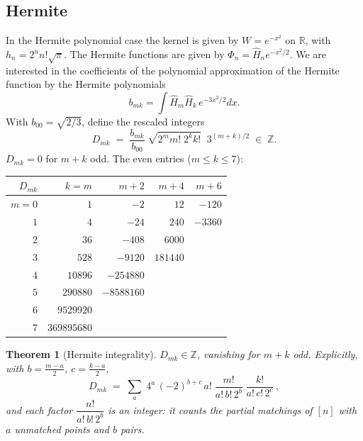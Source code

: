 \documentclass[11pt,a4paper]{article}
\newtheorem{theorem}{Theorem}[section]
\theoremstyle{definition}
\newcommand{\R}{\mathbb{R}}
\newcommand{\Z}{\mathbb{Z}}
\begin{document}
\subsection{Hermite}

In the Hermite polynomial case the kernel is given by
$W = e^{-x^2}$ on $\R$, with $h_n = 2^n n! \sqrt\pi$.
The Hermite functions are given by $\Phi_n = \widehat H_n e^{-x^2/2}$.
We are interested in the coefficients of the polynomial approximation
of the Hermite function by the Hermite polynomials
\[
  b_{mk} = \int \widehat H_m \widehat H_k\, e^{-3x^2/2} dx .
\]
With $b_{00} = \sqrt{2/3}$, define the rescaled integers
\[
  D_{mk} \;=\; \frac{b_{mk}}{b_{00}}\;
  \sqrt{2^m m!\; 2^k k!}\;\; 3^{(m+k)/2} \;\in\; \Z .
\]
$D_{mk} = 0$ for $m+k$ odd. The even entries ($m \le k \le 7$):

\begin{tcolorbox}[colback=black!5, colframe=black!5, boxrule=0pt, sharp corners]
\begin{center}
\begin{tabular}{r|rrrr}
$D_{mk}$ & $k=m$ & $m{+}2$ & $m{+}4$ & $m{+}6$ \\
\hline
$m=0$ & $1$      & $-2$      & $12$      & $-120$ \\
$1$   & $4$      & $-24$     & $240$     & $-3360$ \\
$2$   & $36$     & $-408$    & $6000$    &  \\
$3$   & $528$    & $-9120$   & $181440$  &  \\
$4$   & $10896$  & $-254880$ &           &  \\
$5$   & $290880$ & $-8588160$&           &  \\
$6$   & $9529920$&           &           &  \\
$7$   & $369895680$ &        &           &  \\
\end{tabular}
\end{center}
\end{tcolorbox}

\begin{tcolorbox}[colback=black!5, colframe=black!5, boxrule=0pt, sharp corners]
\begin{theorem}[Hermite integrality]\label{thm:hermite-int}
$D_{mk} \in \Z$, vanishing for $m+k$ odd. Explicitly, with
$b = \tfrac{m-a}{2}$, $c = \tfrac{k-a}{2}$,
\[
  D_{mk} \;=\; \sum_{a}\; 4^a\, (-2)^{b+c}\, a!\;
  \frac{m!}{a!\, b!\, 2^b}\; \frac{k!}{a!\, c!\, 2^c}\,,
\]
and each factor $\dfrac{n!}{a!\, b!\, 2^b}$ is an integer: it counts
the partial matchings of $[n]$ with $a$ unmatched points and $b$ pairs.
\end{theorem}
\end{tcolorbox}
\end{document}
